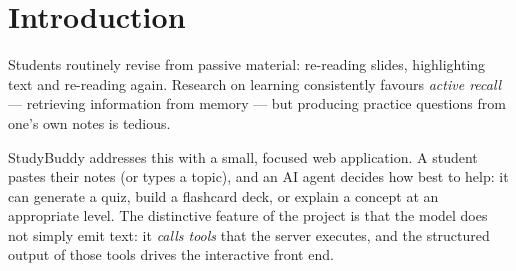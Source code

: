 \documentclass[11pt,a4paper]{article}
\begin{document}
\begin{abstract}
\noindent
StudyBuddy is a publicly deployed web application that helps students turn their own lecture
notes into interactive study material. The project implements an \emph{AI agent} rather than a
plain chatbot: a Node.js/Express back end exposes a set of tools to the Google Gemini model, and
an agentic loop lets the model decide which tool to call, execute it on the server, feed the
result back, and only then produce a final answer for the user. The client side is a chat
interface written in vanilla HTML, CSS and JavaScript: user and agent turns appear as bubbles, the
agent's tool calls are animated as a visible plan, and the quiz, flashcards or explanation built
by a tool are rendered inline in the same conversation.
Quiz results are persisted in the browser with \texttt{localStorage}. The application is deployed
on Vercel and the Gemini API key is kept entirely outside the repository through environment
variables, a strict \texttt{.gitignore} and an automated pre-push secret scanner.
This report describes the requirements, architecture, agent design, implementation,
deployment, security measures, testing, and lessons learned during the project.
\end{abstract}

\tableofcontents
\newpage

\section{Introduction}

Students routinely revise from passive material: re-reading slides, highlighting text and
re-reading again. Research on learning consistently favours \emph{active recall} --- retrieving
information from memory --- but producing practice questions from one's own notes is tedious.

StudyBuddy addresses this with a small, focused web application. A student pastes their notes
(or types a topic), and an AI agent decides how best to help: it can generate a quiz, build a
flashcard deck, or explain a concept at an appropriate level. The distinctive feature of the
project is that the model does not simply emit text: it \emph{calls tools} that the server
executes, and the structured output of those tools drives the interactive front end.
\end{document}
